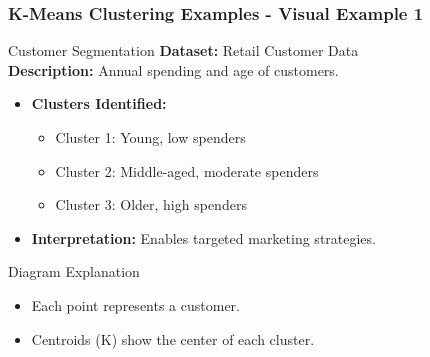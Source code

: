 \documentclass[aspectratio=169]{beamer}
\begin{document}
\begin{frame}[fragile]
    \frametitle{K-Means Clustering Examples - Visual Example 1}
    \begin{block}{Customer Segmentation}
        \textbf{Dataset:} Retail Customer Data\\
        \textbf{Description:} Annual spending and age of customers.
        
        \begin{itemize}
            \item \textbf{Clusters Identified:}
            \begin{itemize}
                \item Cluster 1: Young, low spenders
                \item Cluster 2: Middle-aged, moderate spenders
                \item Cluster 3: Older, high spenders
            \end{itemize}
            \item \textbf{Interpretation:} Enables targeted marketing strategies.
        \end{itemize}
    \end{block}
    
    \begin{block}{Diagram Explanation}
        \begin{itemize}
            \item Each point represents a customer.
            \item Centroids (K) show the center of each cluster.
        \end{itemize}
    \end{block}
\end{frame}
\end{document}

